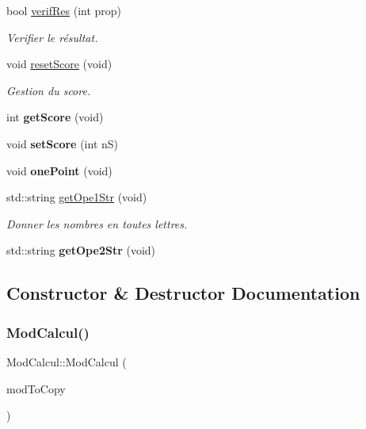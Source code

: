 \begin{DoxyCompactItemize}
bool \hyperlink{class_mod_calcul_a66c4a1a155a2a74a53bba15967ef1bdb}{verif\+Res} (int prop)
\begin{DoxyCompactList}\small\item\em Verifier le résultat. \end{DoxyCompactList}\item 
void \hyperlink{class_mod_calcul_ab2fe81565c7084fa2c4344fce053eb14}{reset\+Score} (void)
\begin{DoxyCompactList}\small\item\em Gestion du score. \end{DoxyCompactList}\item 
\mbox{\label{class_mod_calcul_a6d8cf463ce23eacb768e2ce8ef8e348a}} 
int {\bfseries get\+Score} (void)
\item 
\mbox{\label{class_mod_calcul_ad10794443a0c0684912d1b22e3612bd3}} 
void {\bfseries set\+Score} (int nS)
\item 
\mbox{\label{class_mod_calcul_a7e4594693f592c46b245f1aa1de31ce8}} 
void {\bfseries one\+Point} (void)
\item 
std\+::string \hyperlink{class_mod_calcul_aa16185334bb48c8e312bd0b9148aa00d}{get\+Ope1\+Str} (void)
\begin{DoxyCompactList}\small\item\em Donner les nombres en toutes lettres. \end{DoxyCompactList}\item 
\mbox{\label{class_mod_calcul_a77b55cb859fcae911e8d3d2521885ea5}} 
std\+::string {\bfseries get\+Ope2\+Str} (void)
\end{DoxyCompactItemize}


\subsection{Constructor \& Destructor Documentation}
\mbox{\label{class_mod_calcul_a80ee3b9e056beb4942449219ac036e6e}} 
\subsubsection{\texorpdfstring{Mod\+Calcul()}{ModCalcul()}\hspace{0.1cm}{\footnotesize\ttfamily [1/2]}}
{\footnotesize\ttfamily Mod\+Calcul\+::\+Mod\+Calcul (\begin{DoxyParamCaption}\item[{const \hyperlink{class_mod_calcul}{Mod\+Calcul} \&}]{mod\+To\+Copy }\end{DoxyParamCaption})}


